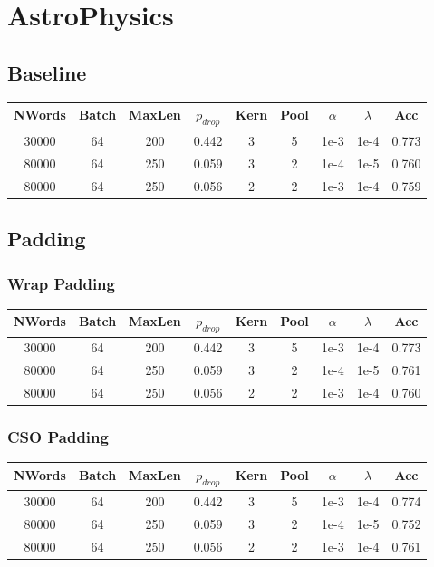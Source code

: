 %
%
\section{AstroPhysics}

\subsection{Baseline}
\begin{center}\begin{tabular}{||c c c c c c c c c||}
 \hline
 NWords & Batch & MaxLen & $p_{drop}$ & Kern & Pool & $\alpha$ & $\lambda$ & Acc\\ [0.5ex]
 \hline\hline
 30000 & 64 & 200 & 0.442 & 3 & 5 & 1e-3 & 1e-4 & 0.773\\
 \hline
 80000 & 64 & 250 & 0.059 & 3 & 2 & 1e-4 & 1e-5 & 0.760\\
 \hline
 80000 & 64 & 250 & 0.056 & 2 & 2 & 1e-3 & 1e-4 & 0.759\\
 [1ex]\hline\end{tabular}\end{center}

\subsection{Padding}
\subsubsection{Wrap Padding}
\begin{center}\begin{tabular}{||c c c c c c c c c ||}
 \hline
 NWords & Batch & MaxLen & $p_{drop}$ & Kern & Pool & $\alpha$ & $\lambda$ & Acc\\ [0.5ex]
 \hline\hline
 30000 & 64 & 200 & 0.442 & 3 & 5 & 1e-3 & 1e-4 & 0.773\\
 \hline
 80000 & 64 & 250 & 0.059 & 3 & 2 & 1e-4 & 1e-5 & 0.761\\
 \hline
 80000 & 64 & 250 & 0.056 & 2 & 2 & 1e-3 & 1e-4 & 0.760\\
 [1ex]\hline\end{tabular}\end{center}

\subsubsection{CSO Padding}
\begin{center}\begin{tabular}{||c c c c c c c c c ||}
 \hline
 NWords & Batch & MaxLen & $p_{drop}$ & Kern & Pool & $\alpha$ & $\lambda$ & Acc\\ [0.5ex]
 \hline\hline
30000 & 64 & 200 & 0.442 & 3 & 5 & 1e-3 & 1e-4 & 0.774\\
\hline
80000 & 64 & 250 & 0.059 & 3 & 2 & 1e-4 & 1e-5 & 0.752\\
\hline
80000 & 64 & 250 & 0.056 & 2 & 2 & 1e-3 & 1e-4 & 0.761\\
 [1ex]\hline\end{tabular}\end{center}


